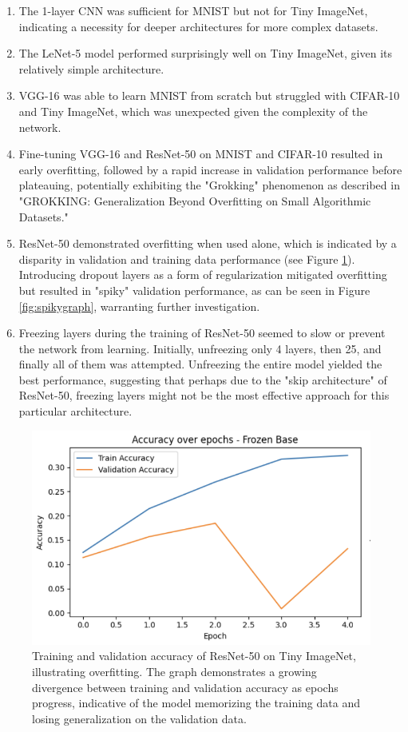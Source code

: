 \documentclass[letterpaper]{article}
\begin{document}
\begin{enumerate}
    \item The 1-layer CNN was sufficient for MNIST but not for Tiny ImageNet, indicating a necessity for deeper architectures for more complex datasets.
    \item The LeNet-5 model performed surprisingly well on Tiny ImageNet, given its relatively simple architecture.
    \item VGG-16 was able to learn MNIST from scratch but struggled with CIFAR-10 and Tiny ImageNet, which was unexpected given the complexity of the network.
    \item Fine-tuning VGG-16 and ResNet-50 on MNIST and CIFAR-10 resulted in early overfitting, followed by a rapid increase in validation performance before plateauing, potentially exhibiting the "Grokking" phenomenon as described in "GROKKING: Generalization Beyond Overfitting on Small Algorithmic Datasets." \cite{power2022grokking}
    \item ResNet-50 demonstrated overfitting when used alone, which is indicated by a disparity in validation and training data performance (see Figure \ref{fig:overfittinggraph}). Introducing dropout layers as a form of regularization mitigated overfitting but resulted in "spiky" validation performance, as can be seen in Figure \ref{fig:spikygraph}, warranting further investigation.
    \item Freezing layers during the training of ResNet-50 seemed to slow or prevent the network from learning. Initially, unfreezing only 4 layers, then 25, and finally all of them was attempted. Unfreezing the entire model yielded the best performance, suggesting that perhaps due to the "skip architecture" of ResNet-50, freezing layers might not be the most effective approach for this particular architecture.
\end{enumerate}
\begin{figure}
    \centering
    \includegraphics[width=0.8\linewidth]{resnet50_tiny_imagenet_overfitting.png}
    \caption{Training and validation accuracy of ResNet-50 on Tiny ImageNet, illustrating overfitting. The graph demonstrates a growing divergence between training and validation accuracy as epochs progress, indicative of the model memorizing the training data and losing generalization on the validation data.}
    \label{fig:overfittinggraph}
\end{figure}
\end{document}
